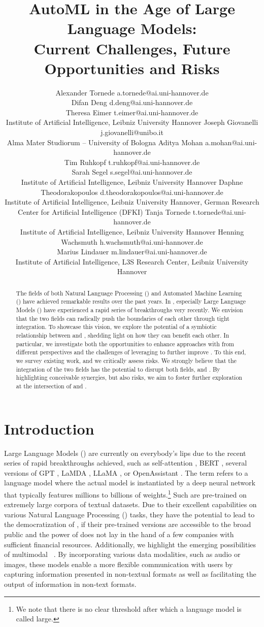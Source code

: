 \documentclass[10pt]{article} %
\title{AutoML in the Age of Large Language Models:\\ Current Challenges, Future Opportunities and Risks}
\author{\name Alexander Tornede \email a.tornede@ai.uni-hannover.de \\
      \vspace{-2em}
      \AND
      \name Difan Deng \email d.deng@ai.uni-hannover.de \\
      \vspace{-2em}
      \AND
      \name Theresa Eimer \email t.eimer@ai.uni-hannover.de \\
      \addr Institute of Artificial Intelligence, Leibniz University Hannover
      \AND
      \name Joseph Giovanelli \email j.giovanelli@unibo.it \\
      \addr Alma Mater Studiorum -- University of Bologna
      \AND
      \name Aditya Mohan \email a.mohan@ai.uni-hannover.de \\
      \vspace{-2em}
      \AND
      \name Tim Ruhkopf \email t.ruhkopf@ai.uni-hannover.de \\
      \vspace{-2em}
      \AND
      \name Sarah Segel \email s.segel@ai.uni-hannover.de \\
      \addr Institute of Artificial Intelligence, Leibniz University Hannover
      \AND
      \name Daphne Theodorakopoulos \email d.theodorakopoulos@ai.uni-hannover.de \\
      \addr Institute of Artificial Intelligence, Leibniz University Hannover, German Research Center for Artificial Intelligence (DFKI)
      \AND
      \name Tanja Tornede \email t.tornede@ai.uni-hannover.de \\
      \addr Institute of Artificial Intelligence, Leibniz University Hannover
      \AND
      \name Henning Wachsmuth \email h.wachsmuth@ai.uni-hannover.de \\
      \vspace{-2em}
      \AND
      \name Marius Lindauer \email m.lindauer@ai.uni-hannover.de \\
      \addr Institute of Artificial Intelligence, L3S Research Center, Leibniz University Hannover
      }
\begin{document}


\maketitle

\begin{abstract}
The fields of both Natural Language Processing (\NLP) and Automated Machine Learning (\AutoML) have achieved remarkable results over the past years. In \NLP, especially Large Language Models (\LLMs) have experienced a rapid series of breakthroughs very recently. We envision that the two fields can radically push the boundaries of each other through tight integration. To showcase this vision, we explore the potential of a symbiotic relationship between \AutoML and \LLMs, shedding light on how they can benefit each other. In particular, we investigate both the opportunities to enhance \AutoML approaches with \LLMs from different perspectives and the challenges of leveraging \AutoML to further improve \LLMs. To this end, we survey existing work, and we critically assess risks. We strongly believe that the integration of the two fields has the potential to disrupt both fields, \NLP and \AutoML. By highlighting conceivable synergies, but also risks, we aim to foster further exploration at the intersection of \AutoML and \LLMs.
\end{abstract}

\section{Introduction}
\label{sec:introcution}
Large Language Models (\LLMs) \citep{zhao-arxiv23a} are currently on everybody's lips due to the recent series of rapid breakthroughs achieved, such as self-attention \citep{vaswani-neurips17a}, BERT \citep{devlin-acl19a}, several versions of GPT \citep{radford-openai18a,radford-openai19a,brown-neurips20a,openai-openai22a,openai-openai23a}, LaMDA \citep{thoppilan-arxiv22a}, LLaMA \citep{touvren-arxiv23a}, or OpenAssistant \citep{koepf-arxiv23a}. The term \LLM refers to a language model where the actual model is instantiated by a deep neural network that typically features millions to billions of weights.\footnote{We note that there is no clear threshold after which a language model is called large.} Such \LLMs are pre-trained on extremely large corpora of textual datasets. Due to their excellent capabilities on various Natural Language Processing (\NLP) tasks, they have the potential to lead to the democratization of \NLP, if their pre-trained versions are accessible to the broad public and the power of \LLMs does not lay in the hand of a few companies with sufficient financial resources. Additionally,  we highlight the emerging possibilities of multimodal \LLMs~\citep{yin-arxiv2023a, wu-arxiv2023a}. By incorporating various data modalities, such as audio or images, these models enable a more flexible communication with users by capturing information presented in non-textual formats as well as facilitating the output of information in non-text formats.
\end{document}
